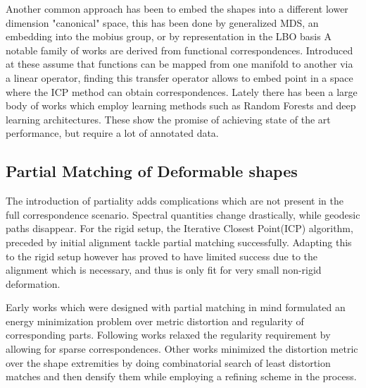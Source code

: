 \documentclass[10pt,twocolumn,letterpaper]{article}
\begin{document}
Another common approach has been to embed the shapes into a different lower dimension "canonical"  space, this has been done by generalized MDS\cite{bronstein2006generalized}, an embedding into the mobius group\cite{lipman2009mobius}, or by representation in the LBO basis\cite{shtern2014matching}
 A notable family of works are derived from functional correspondences. Introduced at\cite{Ovsjanikov:2012:FMF:2185520.2185526,pokrass2013sparse,kovnatsky2015functional,vestner2017efficient} these assume that functions can be mapped from one manifold to another via a linear operator, finding this transfer operator allows to embed point in a space where the ICP method can obtain correspondences. 
Lately there has been a large body of works which employ learning methods such as Random Forests\cite{Rodola:2014:DNS:2679600.2679987} and deep learning architectures\cite{masci2016geometric,boscaini2016learning,monti2017geometric}. These show the promise of achieving state of the art performance, but require a lot of annotated data.

\subsection{Partial Matching of Deformable shapes}
The introduction of partiality adds complications which are not present in the full correspondence scenario. Spectral quantities change drastically, while geodesic paths disappear.
For the rigid setup, the Iterative Closest Point(ICP)\cite{Aiger:2008:CSR:1360612.1360684} algorithm, preceded by initial alignment\cite{rusu2008towards} tackle partial matching successfully. Adapting this to the rigid setup however has proved to have limited success due to the alignment which is necessary, and thus is only fit for very small non-rigid deformation.

Early works which were designed with partial matching in mind\cite{bronstein2008not,bronstein2009partial} formulated an energy minimization problem over metric distortion and regularity of corresponding parts. Following works relaxed the regularity requirement by allowing for sparse correspondences\cite{Torsello:2012:GAD:2354409.2354702,rodola2013elastic}. 
Other works\cite{sahilliouglu2012scale,sahilliouglu2012minimum} minimized the distortion metric over the shape extremities by doing combinatorial search of least distortion matches and then densify them while employing a refining scheme in the process. 
\end{document}
